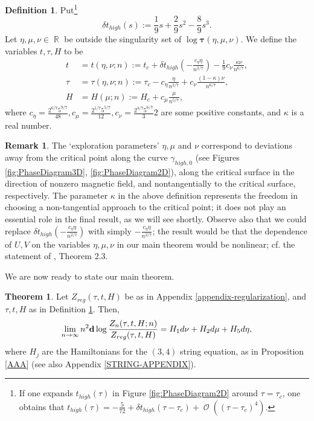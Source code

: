 \documentclass[usenames,dvipsnames]{article}
\theoremstyle{definition}
\newtheorem{defn}{Definition}[section]
\newtheorem{theorem}{Theorem}[section]
\newtheorem{remark}{Remark}[section]
\DeclareMathOperator{\RR}{\mathbb{R}}
\DeclareMathOperator{\OO}{\mathcal{O}}
\numberwithin{equation}{section}
\numberwithin{figure}{section}
\begin{document}
\begin{defn}\label{scaling-variables-def}
    Put\footnote{If one expands $t_{high}(\tau)$ in Figure \ref{fig:PhaseDiagram2D} around $\tau = \tau_c$, one obtains that $t_{high}(\tau) = -\frac{5}{72} + \delta t_{high}(\tau-\tau_c) + \OO((\tau-\tau_c)^4)$.}
    \begin{equation}
        \delta t_{high}(s) := \frac{1}{9}s + \frac{2}{9}s^2-\frac{8}{9}s^3.
    \end{equation}
    Let $\eta,\mu,\nu\in \RR$ be outside the singularity set of $\log \boldsymbol{\tau}(\eta,\mu,\nu)$.
    We define the variables $t,\tau,H$ to be
        \begin{align}
            t &= t(\eta,\nu;n) := t_c + \delta t_{high}\left(-\frac{c_{\eta}\eta}{n^{2/7}} \right) - \frac{1}{9}c_{\nu} \frac{\kappa \nu}{n^{6/7}},\\
            \tau &= \tau(\eta,\nu;n):= \tau_c -c_{\eta} \frac{\eta}{n^{2/7}}  + c_{\nu}\frac{(1-\kappa)\nu}{n^{6/7}},\\
            H &= H(\mu;n) := H_c + c_{\mu} \frac{\mu}{n^{5/7}},
        \end{align}
    where $c_{\eta} = \frac{2^{6/7}5^{9/7}}{48},c_{\mu} = \frac{2^{1/7}5^{5/7}}{12}, c_{\nu} = \frac{2^{4/7}5^{6/7}}32$ are some positive constants, and $\kappa$ is a real number.
\end{defn}

\begin{remark}
    The `exploration parameters' $\eta,\mu$ and $\nu$ correspond to deviations away from the critical point along the curve $\gamma_{high,0}$ (see Figures \ref{fig:PhaseDiagram3D}, \ref{fig:PhaseDiagram2D}), along the critical surface in the direction of nonzero magnetic field, and nontangentially to the critical surface, respectively. The parameter $\kappa$ in the above definition represents the freedom in choosing a non-tangential approach to the critical point; it does not play an essential role in the final result, as we will see shortly. Observe also that we could replace $\delta t_{high}\left(-\frac{c_{\eta}\eta}{n^{2/7}} \right)$ with simply $-\frac{c_{\eta}\eta}{n^{2/7}}$; the result would be that the dependence of $U,V$ on the variables $\eta,\mu,\nu$ in our main theorem would be nonlinear; cf. the statement of \cite{DG}, Theorem 2.3.
\end{remark}

We are now ready to state our main theorem.
\begin{theorem}\label{main-theorem}
    Let $Z_{reg}(\tau,t,H)$ be as in Appendix \ref{appendix-regularization}, and $\tau,t,H$ as in Definition \ref{scaling-variables-def}. Then,
        \begin{equation}
            \lim_{n\to \infty} n^2{\bf d}\log\frac{Z_{n}(\tau,t,H;n)}{Z_{reg}(\tau,t,H)} = H_1 d\nu + H_2d\mu + H_5d\eta,
        \end{equation}
    where $H_j$ are the Hamiltonians for the $(3,4)$ string equation, as in Proposition \ref{AAA} (see also Appendix \ref{STRING-APPENDIX}).
\end{theorem}
\end{document}
